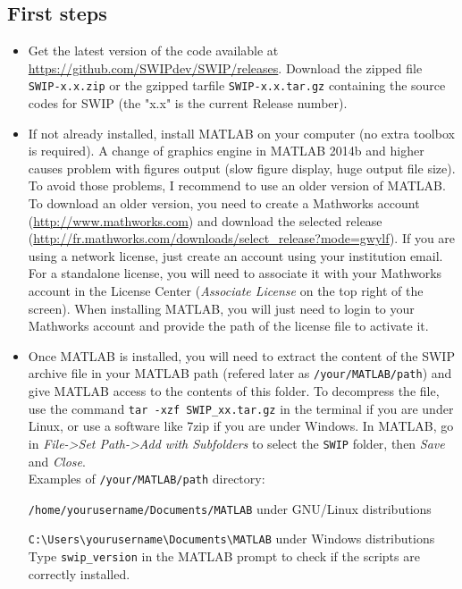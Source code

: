 \documentclass[twoside,a4paper]{article}
\begin{document}
\subsection{First steps}
\begin{itemize}
\setlength\itemsep{2ex}
\setlength{\parindent}{5ex}
\item Get the latest version of the code available at \url{https://github.com/SWIPdev/SWIP/releases}. Download the zipped file \verb|SWIP-x.x.zip| or the gzipped tarfile \verb|SWIP-x.x.tar.gz| containing the source codes for SWIP (the "x.x" is the current Release number).

\item If not already installed, install MATLAB on your computer (no extra toolbox is required). A change of graphics engine in MATLAB 2014b and higher causes problem with figures output (slow figure display, huge output file size). To avoid those problems, I recommend to use an older version of MATLAB.\\[1ex]
To download an older version, you need to create a Mathworks account (\url{http://www.mathworks.com}) and download the selected release (\url{http://fr.mathworks.com/downloads/select_release?mode=gwylf}). If you are using a network license, just create an account using your institution email. For a standalone license, you will need to associate it with your Mathworks account in the License Center (\textit{Associate License} on the top right of the screen). When installing MATLAB, you will just need to login to your Mathworks account and provide the path of the license file to activate it.

\item Once MATLAB is installed, you will need to extract the content of the SWIP archive file in your MATLAB path (refered later as \verb|/your/MATLAB/path|) and give MATLAB access to the contents of this folder. To decompress the file, use the command \verb|tar -xzf SWIP_xx.tar.gz| in the terminal if you are under Linux, or use a software like 7zip if you are under Windows. In MATLAB, go in \textit{File->Set Path->Add with Subfolders} to select the \verb|SWIP| folder, then \textit{Save} and \textit{Close}.\\[1ex]
Examples of \verb|/your/MATLAB/path| directory:

\verb|/home/yourusername/Documents/MATLAB| under GNU/Linux distributions

\verb|C:\Users\yourusername\Documents\MATLAB| under Windows distributions\\[1ex]
Type \verb|swip_version| in the MATLAB prompt to check if the scripts are correctly installed.
\end{itemize}
\end{document}
